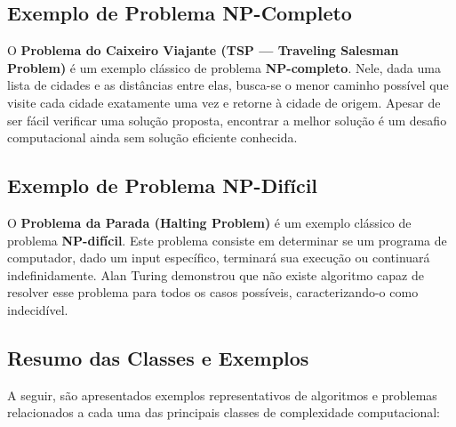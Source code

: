 \documentclass[12pt,oneside,a4paper]{report}
\begin{document}
\subsection{Exemplo de Problema NP-Completo}

O \textbf{Problema do Caixeiro Viajante (TSP — Traveling Salesman Problem)} é um exemplo clássico de problema \textbf{NP-completo}. Nele, dada uma lista de cidades e as distâncias entre elas, busca-se o menor caminho possível que visite cada cidade exatamente uma vez e retorne à cidade de origem. Apesar de ser fácil verificar uma solução proposta, encontrar a melhor solução é um desafio computacional ainda sem solução eficiente conhecida.

\subsection{Exemplo de Problema NP-Difícil}

O \textbf{Problema da Parada (Halting Problem)} é um exemplo clássico de problema \textbf{NP-difícil}. Este problema consiste em determinar se um programa de computador, dado um input específico, terminará sua execução ou continuará indefinidamente. Alan Turing demonstrou que não existe algoritmo capaz de resolver esse problema para todos os casos possíveis, caracterizando-o como indecidível.

\subsection{Resumo das Classes e Exemplos}

A seguir, são apresentados exemplos representativos de algoritmos e problemas relacionados a cada uma das principais classes de complexidade computacional:
\end{document}
